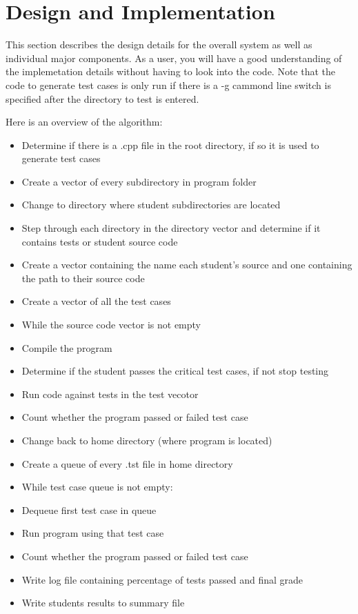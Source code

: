 \chapter{Design  and Implementation}
 This section describes the design details for the overall system as well as individual major components. As a user, you will have a good understanding of the implemetation details without having to look into the code. Note that the
 code to generate test cases is only run if there is a -g cammond line switch is specified after the directory to test is entered.

 Here is an overview of the algorithm:

\begin{itemize}
  \item Determine if there is a .cpp file in the root directory, if so it is used to generate test cases
  \item Create a vector of every subdirectory in program folder
  \item Change to directory where student subdirectories are located
  \item Step through each directory in the directory vector and determine if it contains tests or student source code
  \item Create a vector containing the name each student's source and one containing the path to their source code
  \item Create a vector of all the test cases
  \item While the source code vector is not empty
  \item Compile the program
  \item Determine if the student passes the critical test cases, if not stop testing
  \item Run code against tests in the test vecotor
  \item Count whether the program passed or failed test case
  \item Change back to home directory (where program is located)
  \item Create a queue of every .tst file in home directory
  \item While test case queue is not empty:
  \item Dequeue first test case in queue
  \item Run program using that test case
  \item Count whether the program passed or failed test case
  \item Write log file containing percentage of tests passed and final grade
  \item Write students results to summary file
\end{itemize}


